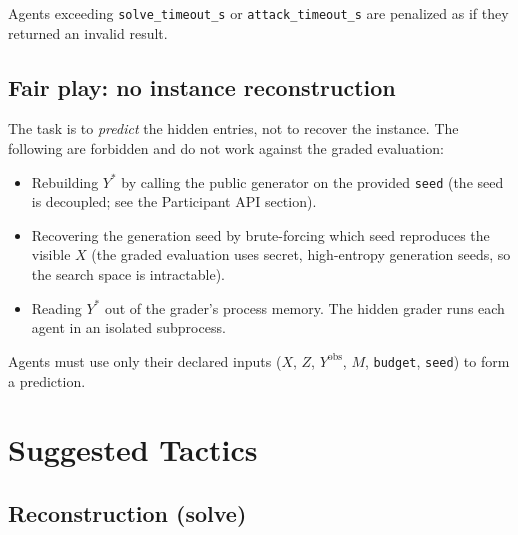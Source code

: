 \documentclass[11pt,a4paper]{article}
\begin{document}
Agents exceeding \texttt{solve\_timeout\_s} or \texttt{attack\_timeout\_s} are
penalized as if they returned an invalid result.

\subsection{Fair play: no instance reconstruction}

The task is to \emph{predict} the hidden entries, not to recover the instance.
The following are forbidden and do not work against the graded evaluation:
\begin{itemize}
  \item Rebuilding $Y^*$ by calling the public generator on the provided
        \texttt{seed} (the seed is decoupled; see the Participant API section).
  \item Recovering the generation seed by brute-forcing which seed reproduces
        the visible $X$ (the graded evaluation uses secret, high-entropy
        generation seeds, so the search space is intractable).
  \item Reading $Y^*$ out of the grader's process memory. The hidden grader runs
        each agent in an isolated subprocess.
\end{itemize}
Agents must use only their declared inputs ($X$, $Z$, $Y^{\text{obs}}$, $M$,
\texttt{budget}, \texttt{seed}) to form a prediction.

\section{Suggested Tactics}

\subsection{Reconstruction (solve)}
\end{document}

